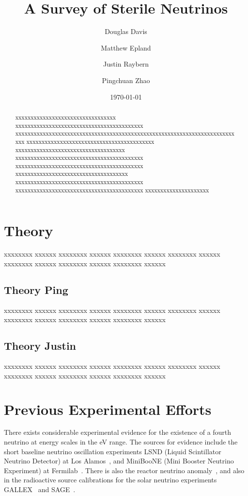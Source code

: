 \documentclass[aps,prd,twocolumn,nofootinbib]{revtex4-1}
\begin{document}
\title{A Survey of Sterile Neutrinos}
\author{Douglas Davis}
\author{Matthew Epland}
\author{Justin Raybern}
\author{Pingchuan Zhao}
\date{\today}
\begin{abstract}
xxxxxxxxxxxxxxxxxxxxxxxxxxxxxxxxx xxxxxxxxxxxxxxxxxxxxxxxxxxxxxxxxxxxxxxxxxx xxxxxxxxxxxxxxxxxxxxxxxxxxxxxxxxxxxxxxxxxxxxxxxxxxxxxxxxxxxxxxxxxxxxxxxxxxx xxxxxxxxxxxxxxxxxxxxxxxxxxxxxxxxxxxxxxxxxx xxxxxxxxxxxxxxxxxxxxxxxxxxxxxxxxxxxx xxxxxxxxxxxxxxxxxxxxxxxxxxxxxxxxxxxxxxxxxx xxxxxxxxxxxxxxxxxxxxxxxxxxxxxxxxxxxxxxxxxx xxxxxxxxxxxxxxxxxxxxxxxxxxxxxxxxxxxxx xxxxxxxxxxxxxxxxxxxxxxxxxxxxxxxxxxxxxxxxxx xxxxxxxxxxxxxxxxxxxxxxxxxxxxxxxxxxxxxxxxxx xxxxxxxxxxxxxxxxxxxxx
\end{abstract}\maketitle
\section{Theory}
\label{sec:theory}
xxxxxxxx xxxxxx xxxxxxxx xxxxxx xxxxxxxx xxxxxx xxxxxxxx xxxxxx xxxxxxxx xxxxxx xxxxxxxx xxxxxx xxxxxxxx xxxxxx
\subsection{Theory Ping}
xxxxxxxx xxxxxx xxxxxxxx xxxxxx xxxxxxxx xxxxxx xxxxxxxx xxxxxx xxxxxxxx xxxxxx xxxxxxxx xxxxxx xxxxxxxx xxxxxx
\subsection{Theory Justin}
xxxxxxxx xxxxxx xxxxxxxx xxxxxx xxxxxxxx xxxxxx xxxxxxxx xxxxxx xxxxxxxx xxxxxx xxxxxxxx xxxxxx xxxxxxxx xxxxxx
\section{Previous Experimental Efforts}
There exists considerable experimental evidence for the existence of a fourth neutrino at energy scales in the eV range. The sources for evidence include the short baseline neutrino oscillation experiments LSND (Liquid Scintillator Neutrino Detector) at Los Alamos~\cite{LSND}, and MiniBooNE (Mini Booster Neutrino Experiment) at Fermilab~\cite{mini1,mini2}. There is also the reactor neutrino anomaly~\cite{reactor_anom1}, and also in the radioactive source calibrations for the solar neutrino experiments GALLEX~\cite{gallex1,gallex2} and SAGE~\cite{sage1,sage2}.
\end{document}
